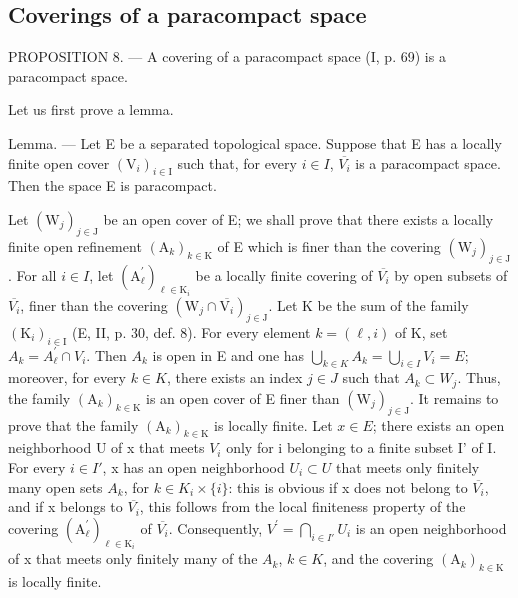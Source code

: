 \subsection{Coverings of a paracompact space}

PROPOSITION 8. --- A covering of a paracompact space (I, p. 69) is a paracompact space.

Let us first prove a lemma.

Lemma. --- Let E be a separated topological space. Suppose that E has a locally finite open cover \((\mathrm{V}_{i})_{i\in\mathrm{I}}\) such that, for every \(i\in I\), \(\overline{V_{i}}\) is a paracompact space. Then the space E is paracompact.

Let \((\mathrm{W}_{j})_{j\in\mathrm{J}}\) be an open cover of E; we shall prove that there exists a locally finite open refinement \((\mathrm{A}_{k})_{k\in\mathrm{K}}\) of E which is finer than the covering \((\mathrm{W}_{j})_{j\in\mathrm{J}}\). For all \(i\in I\), let \((\mathrm{A}_{\ell}^{\prime})_{\ell\in\mathrm{K}_{i}}\) be a locally finite covering of \(\overline{V_{i}}\) by open subsets of \(\overline{V_{i}}\), finer than the covering \((\mathrm{W}_{j}\cap\overline{\mathrm{V}_{i}})_{j\in\mathrm{J}}\). Let K be the sum of the family \((\mathrm{K}_{i})_{i\in\mathrm{I}}\) (E, II, p. 30, def. 8). For every element \(k=(\ell,i)\) of K, set \(A_{k}=A_{\ell}^{\prime}\cap V_{i}\). Then \(A_{k}\) is open in E and one has \(\bigcup_{k\in K}A_{k}=\bigcup_{i\in I}V_{i}=E\); moreover, for every \(k\in K\), there exists an index \(j\in J\) such that \(A_{k}\subset W_{j}\). Thus, the family \((\mathrm{A}_{k})_{k\in\mathrm{K}}\) is an open cover of E finer than \((\mathrm{W}_{j})_{j\in\mathrm{J}}\). It remains to prove that the family \((\mathrm{A}_{k})_{k\in\mathrm{K}}\) is locally finite. Let \(x\in E\); there exists an open neighborhood U of x that meets \(V_{i}\) only for i belonging to a finite subset I' of I. For every \(i\in I'\), x has an open neighborhood \(U_{i}\subset U\) that meets only finitely many open sets \(A_{k}\), for \(k\in K_{i}\times\{i\}\): this is obvious if x does not belong to \(\overline{V_{i}}\), and if x belongs to \(\overline{V_{i}}\), this follows from the local finiteness property of the covering \((\mathrm{A}_{\ell}^{\prime})_{\ell\in\mathrm{K}_{i}}\) of \(\overline{V_{i}}\). Consequently, \(V^{\prime}=\bigcap_{i\in I'}U_{i}\) is an open neighborhood of x that meets only finitely many of the \(A_{k}\), \(k\in K\), and the covering \((\mathrm{A}_{k})_{k\in\mathrm{K}}\) is locally finite.

